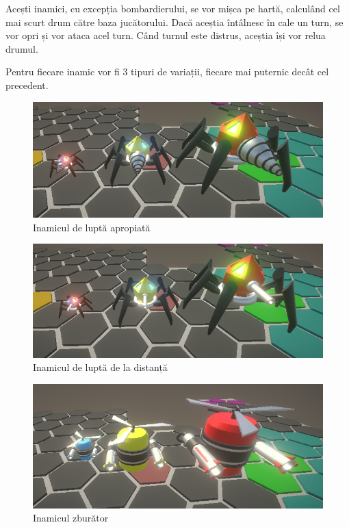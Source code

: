 \documentclass[12pt, a4paper]{article}
\begin{document}
	Acești inamici, cu excepția bombardierului, se vor mișca pe hartă, calculând cel mai scurt drum către baza jucătorului. Dacă aceștia întâlnesc în cale un turn, se vor opri și vor ataca acel turn. Când turnul este distrus, aceștia își vor relua drumul.
	\newline
	
	Pentru fiecare inamic vor fi 3 tipuri de variații, fiecare mai puternic decât cel precedent.
	
	\begin{figure}[H]
		\centering
		\includegraphics[width=1\textwidth]{Melee.png}
		\caption{Inamicul de luptă apropiată}
		\label{fig: enemyMelee}
	\end{figure}

	\begin{figure}[H]
		\centering
		\includegraphics[width=1\textwidth]{Ranged.png}
		\caption{Inamicul de luptă de la distanță}
		\label{fig: enemyRanged}
	\end{figure}
	
	\begin{figure}[H]
		\centering
		\includegraphics[width=1\textwidth]{Flying.png}
		\caption{Inamicul zburător}
		\label{fig: enemyFlying}
	\end{figure}
	
\end{document}
